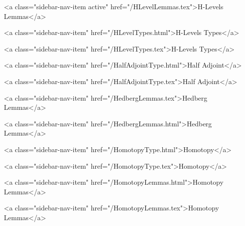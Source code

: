       
        
          <a class="sidebar-nav-item active" href="/HLevelLemmas.tex">H-Levels Lemmas</a>
        
      
    
      
        
          <a class="sidebar-nav-item" href="/HLevelTypes.html">H-Levels Types</a>
        
      
    
      
        
          <a class="sidebar-nav-item" href="/HLevelTypes.tex">H-Levels Types</a>
        
      
    
      
        
          <a class="sidebar-nav-item" href="/HalfAdjointType.html">Half Adjoint</a>
        
      
    
      
        
          <a class="sidebar-nav-item" href="/HalfAdjointType.tex">Half Adjoint</a>
        
      
    
      
        
          <a class="sidebar-nav-item" href="/HedbergLemmas.tex">Hedberg Lemmas</a>
        
      
    
      
        
          <a class="sidebar-nav-item" href="/HedbergLemmas.html">Hedberg Lemmas</a>
        
      
    
      
        
          <a class="sidebar-nav-item" href="/HomotopyType.html">Homotopy</a>
        
      
    
      
        
          <a class="sidebar-nav-item" href="/HomotopyType.tex">Homotopy</a>
        
      
    
      
        
          <a class="sidebar-nav-item" href="/HomotopyLemmas.html">Homotopy Lemmas</a>
        
      
    
      
        
          <a class="sidebar-nav-item" href="/HomotopyLemmas.tex">Homotopy Lemmas</a>
        
      
    
